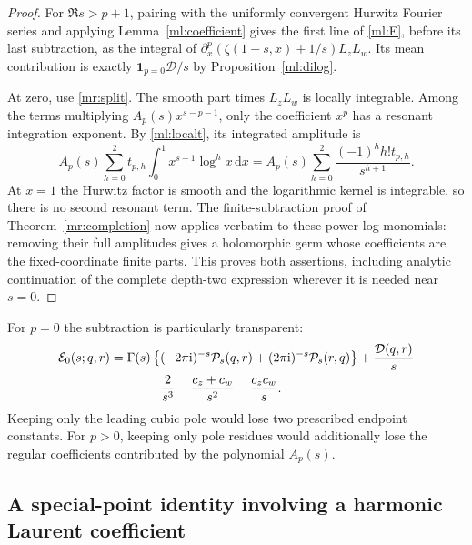 \documentclass[11pt]{article}
\numberwithin{equation}{section}
\theoremstyle{plain}
\theoremstyle{definition}
\theoremstyle{remark}
\newcommand{\ii}{\mathrm i}
\newcommand{\dd}{\,\mathrm d}
\begin{document}
\begin{proof}
For $\Re s>p+1$, pairing with the uniformly convergent Hurwitz Fourier
series and applying Lemma~\ref{ml:coefficient} gives the first line of
\eqref{ml:E}, before its last subtraction, as the integral of
$\partial_x^p(\zeta(1-s,x)+1/s)L_zL_w$. Its mean contribution is
exactly $\mathbf1_{p=0}\mathcal D/s$ by Proposition~\ref{ml:dilog}.

At zero, use \eqref{mr:split}. The smooth part times $L_zL_w$ is
locally integrable. Among the terms multiplying $A_p(s)x^{s-p-1}$,
only the coefficient $x^p$ has a resonant integration exponent.
By \eqref{ml:localt}, its integrated amplitude is
\[
 A_p(s)\sum_{h=0}^2t_{p,h}
                 \int_0^1x^{s-1}\log^hx\dd x
     =A_p(s)\sum_{h=0}^2\frac{(-1)^hh!t_{p,h}}{s^{h+1}}.
\]
At $x=1$ the Hurwitz factor is smooth and the logarithmic kernel is
integrable, so there is no second resonant term. The finite-subtraction
proof of Theorem~\ref{mr:completion} now applies verbatim to these
power-log monomials: removing their full amplitudes gives a holomorphic
germ whose coefficients are the fixed-coordinate finite parts.
This proves both assertions, including analytic continuation of the
complete depth-two expression wherever it is needed near $s=0$.
\end{proof}

For $p=0$ the subtraction is particularly transparent:
\begin{align}
 \mathcal E_0(s;q,r)={}&\Gamma(s)
   \left\{(-2\pi\ii)^{-s}\mathcal P_s(q,r)
                        +(2\pi\ii)^{-s}\mathcal P_s(r,q)\right\}
     +\frac{\mathcal D(q,r)}s\notag\\
 &\hspace{5mm}-\frac2{s^3}-\frac{c_z+c_w}{s^2}-\frac{c_zc_w}s.
       \label{ml:pzero}
\end{align}
Keeping only the leading cubic pole would lose two prescribed endpoint
constants. For $p>0$, keeping only pole residues would additionally lose
the regular coefficients contributed by the polynomial $A_p(s)$.

\subsection{A special-point identity involving a harmonic Laurent coefficient}
\end{document}
